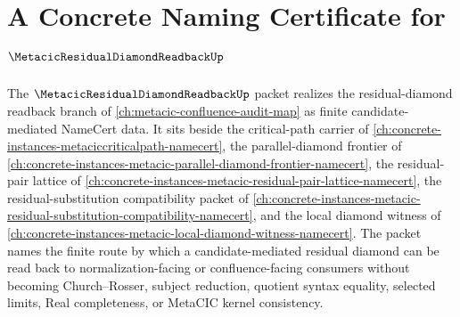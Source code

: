 \chapter{A Concrete Naming Certificate for $\MetacicResidualDiamondReadbackUp$}
\label{ch:concrete-instances-metacic-residual-diamond-readback-namecert}

The $\MetacicResidualDiamondReadbackUp$ packet realizes the residual-diamond readback branch of \autoref{ch:metacic-confluence-audit-map} as finite candidate-mediated NameCert data. It sits beside the critical-path carrier of \autoref{ch:concrete-instances-metaciccriticalpath-namecert}, the parallel-diamond frontier of \autoref{ch:concrete-instances-metacic-parallel-diamond-frontier-namecert}, the residual-pair lattice of \autoref{ch:concrete-instances-metacic-residual-pair-lattice-namecert}, the residual-substitution compatibility packet of \autoref{ch:concrete-instances-metacic-residual-substitution-compatibility-namecert}, and the local diamond witness of \autoref{ch:concrete-instances-metacic-local-diamond-witness-namecert}. The packet names the finite route by which a candidate-mediated residual diamond can be read back to normalization-facing or confluence-facing consumers without becoming Church--Rosser, subject reduction, quotient syntax equality, selected limits, Real completeness, or MetaCIC kernel consistency.

